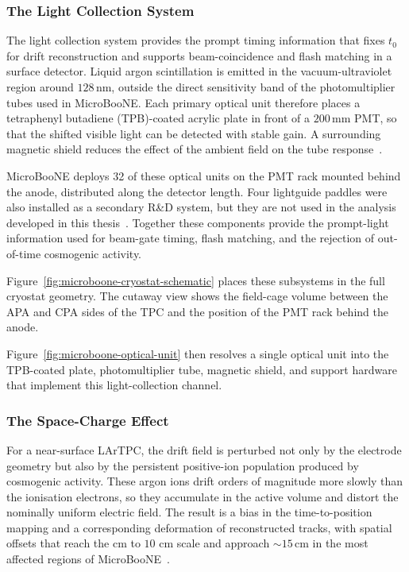 \subsubsection{The Light Collection System}

The light collection system provides the prompt timing information that fixes
\(t_0\) for drift reconstruction and supports beam-coincidence and flash
matching in a surface detector. Liquid argon scintillation is emitted in the
vacuum-ultraviolet region around \(128\,\mathrm{nm}\), outside the direct
sensitivity band of the photomultiplier tubes used in MicroBooNE. Each primary
optical unit therefore places a tetraphenyl butadiene (TPB)-coated acrylic
plate in front of a \(200\,\mathrm{mm}\) PMT, so that the shifted visible
light can be detected with stable gain. A surrounding magnetic shield reduces
the effect of the ambient field on the tube response~\cite{MicroBooNEDesign}.

MicroBooNE deploys 32 of these optical units on the PMT rack mounted behind the
anode, distributed along the detector length. Four lightguide paddles were
also installed as a secondary R\&D system, but they are not used in the
analysis developed in this thesis~\cite{MicroBooNEDesign}. Together these
components provide the prompt-light information used for beam-gate timing,
flash matching, and the rejection of out-of-time cosmogenic activity.

Figure~\ref{fig:microboone-cryostat-schematic} places these subsystems in the
full cryostat geometry. The cutaway view shows the field-cage volume between
the APA and CPA sides of the TPC and the position of the PMT rack behind the
anode.



Figure~\ref{fig:microboone-optical-unit} then resolves a single optical unit
into the TPB-coated plate, photomultiplier tube, magnetic shield, and support
hardware that implement this light-collection channel.



\subsubsection{The Space-Charge Effect}

For a near-surface LArTPC, the drift field is perturbed not only by the
electrode geometry but also by the persistent positive-ion population produced
by cosmogenic activity. These argon ions drift orders of magnitude more slowly
than the ionisation electrons, so they accumulate in the active volume and
distort the nominally uniform electric field. The result is a bias in the
time-to-position mapping and a corresponding deformation of reconstructed
tracks, with spatial offsets that reach the cm to \(10\) cm scale and approach
\(\sim 15\,\mathrm{cm}\) in the most affected regions of MicroBooNE~\cite{MicroBooNE_SCE_JINST2020}.

